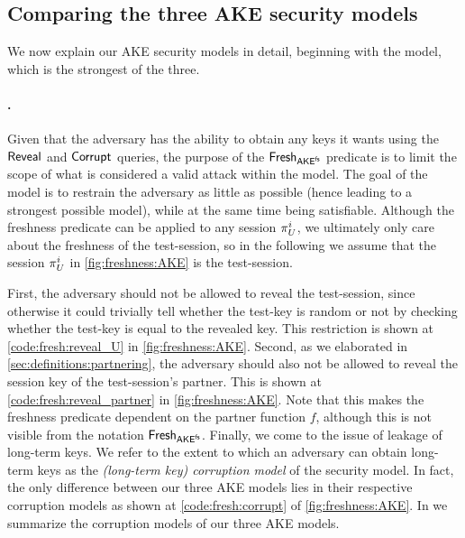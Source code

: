 \subsection{Comparing the three AKE security models}

We now explain our AKE security models in detail,
beginning with the \akefstext model,
which is the strongest of the three.



\paragraph{\texorpdfstring{\akefstext}{AKEfs}.}
Given that the adversary has the ability to obtain any keys it wants using the $\mathsf{Reveal}$ and $\mathsf{Corrupt}$ queries,
the purpose of the $\mathsf{Fresh}_{\mathsf{AKE}^{\mathsf{fs}}}$ predicate is to limit the scope of what is considered a valid attack within the model.
The goal of the \akefstext model is to restrain the adversary as little as possible
(hence leading to a strongest possible model),
while at the same time being satisfiable.
Although the freshness predicate can be applied to any session $\oracle[U][i]$,
we ultimately only care about the freshness of the test-session,
so in the following we assume that the session $\oracle[U][i]$ in \cref{fig:freshness:AKE} is the test-session.

First,
the adversary should not be allowed to reveal the test-session,
since otherwise it could trivially tell whether the test-key is random or not by checking whether the test-key is equal to the revealed key.
This restriction is shown at \cref{code:fresh:reveal_U} in \cref{fig:freshness:AKE}.
Second,
as we elaborated in \cref{sec:definitions:partnering},
the adversary should also not be allowed to reveal the session key of the test-session's partner.
This is shown at \cref{code:fresh:reveal_partner} in \cref{fig:freshness:AKE}.
Note that this makes the freshness predicate dependent on the partner function $f$,
although this is not visible from the notation $\mathsf{Fresh}_{\mathsf{AKE}^{\mathsf{fs}}}$.
Finally,
we come to the issue of leakage of long-term keys.
We refer to the extent to which an adversary can obtain long-term keys as the \emph{(long-term key) corruption model} of the security model.
In fact,
the only difference between our three AKE models lies in their respective corruption models as shown at \cref{code:fresh:corrupt} of \cref{fig:freshness:AKE}.
In  we summarize the corruption models of our three AKE models. 




